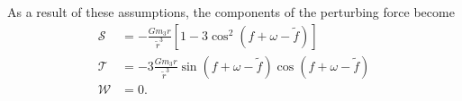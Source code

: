 As a result of these assumptions, the components of the perturbing force become
\begin{subequations}\label{eq:ThirdBodyPerturbingForceComponents}
\begin{align}
\mathcal{S} &= - \frac{Gm_3 r}{\tilde{r}^3} \left[ 1- 3 \cos^2 (f + \omega - \tilde{f}) \right] \\
\mathcal{T} &=- 3 \frac{Gm_3 r}{\tilde{r}^3}  \sin (f + \omega - \tilde{f}) \cos (f + \omega - \tilde{f}) \\
\mathcal{W} &= 0.
\end{align}
\end{subequations}




